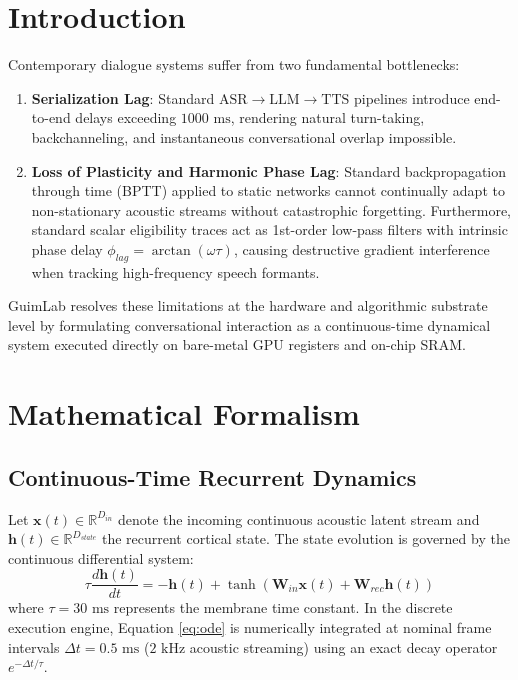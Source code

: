 \documentclass[10pt,twocolumn,letterpaper]{article}
\begin{document}
\section{Introduction}
Contemporary dialogue systems suffer from two fundamental bottlenecks:
\begin{enumerate}
  \item \textbf{Serialization Lag}: Standard $\text{ASR} \to \text{LLM} \to \text{TTS}$ pipelines introduce end-to-end delays exceeding $1000\text{ ms}$, rendering natural turn-taking, backchanneling, and instantaneous conversational overlap impossible.
  \item \textbf{Loss of Plasticity and Harmonic Phase Lag}: Standard backpropagation through time (BPTT) applied to static networks cannot continually adapt to non-stationary acoustic streams without catastrophic forgetting. Furthermore, standard scalar eligibility traces act as 1st-order low-pass filters with intrinsic phase delay $\phi_{lag} = \arctan(\omega \tau)$, causing destructive gradient interference when tracking high-frequency speech formants.
\end{enumerate}
GuimLab resolves these limitations at the hardware and algorithmic substrate level by formulating conversational interaction as a continuous-time dynamical system executed directly on bare-metal GPU registers and on-chip SRAM.

\section{Mathematical Formalism}

\subsection{Continuous-Time Recurrent Dynamics}
Let $\mathbf{x}(t) \in \mathbb{R}^{D_{in}}$ denote the incoming continuous acoustic latent stream and $\mathbf{h}(t) \in \mathbb{R}^{D_{state}}$ the recurrent cortical state. The state evolution is governed by the continuous differential system:
\begin{equation}
\tau \frac{d\mathbf{h}(t)}{dt} = -\mathbf{h}(t) + \tanh\left(\mathbf{W}_{in} \mathbf{x}(t) + \mathbf{W}_{rec} \mathbf{h}(t)\right)
\label{eq:ode}
\end{equation}
where $\tau = 30\text{ ms}$ represents the membrane time constant. In the discrete execution engine, Equation \eqref{eq:ode} is numerically integrated at nominal frame intervals $\Delta t = 0.5\text{ ms}$ ($2\text{ kHz}$ acoustic streaming) using an exact decay operator $e^{-\Delta t/\tau}$.
\end{document}
